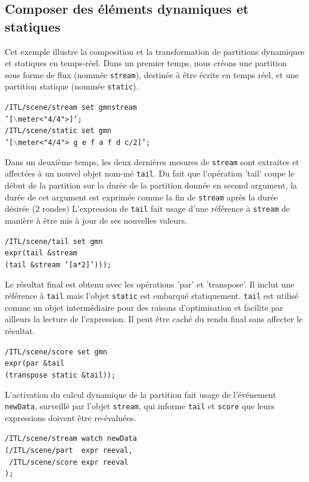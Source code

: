 \documentclass{article}
\newcommand{\OSC}[1]	{{\fontsize{10pt}{10pt} \selectfont\texttt{#1}}}
\newcommand{\tab}{\hspace*{4mm}}
\newcommand{\sample}	[1]			{\vspace{-0.2em}\begin{center}\colorbox{mygrey}{\begin{minipage}[t]{0.97\columnwidth} {\small \texttt{#1}}\end{minipage}}\end{center}}
\begin{document}
\subsection{Composer des éléments dynamiques et statiques}\label{sample3}
Cet exemple illustre la composition et la transformation de partitions dynamiques et statiques en temps-réel.
Dans un premier temps, nous créons une partition sous forme de flux (nommée \OSC{stream}), destinée à être écrite en temps réel, et une partition statique (nommée \OSC{static}).
\sample{/ITL/scene/stream set gmnstream \\
\tab \tab '[$\backslash$meter<"4/4">]';\\
/ITL/scene/static set gmn \\
\tab \tab '[$\backslash$meter<"4/4"> g e f a f d c/2]';
}
Dans un deuxième temps, les deux dernières mesures de \OSC{stream} sont extraites et affectées à un nouvel objet nom-mé\OSC{tail}. Du fait que l'opération 'tail' coupe le début de la partition sur la durée de la partition donnée en second argument, la durée de cet argument est exprimée comme la fin de \OSC{stream} après la durée désirée (2 rondes)
L'expression de \OSC{tail} fait usage d'une référence à \OSC{stream} de manière à être mis à jour de ses nouvelles valeurs. 
\sample{/ITL/scene/tail set gmn \\
\tab \tab expr(tail \&stream \\
\tab \tab \tab \tab (tail \&stream '[a*2]')));
}
Le résultat final est obtenu avec les opérations 'par' et 'transpose'. Il inclut une référence à \OSC{tail} mais l'objet \OSC{static} est embarqué statiquement. \OSC{tail} est utilisé comme un objet intermédiaire pour des raisons d'optimisation et facilite par ailleurs la lecture de l'expression. Il peut être caché du rendu final sans affecter le résultat.
\sample{/ITL/scene/score set gmn \\
\tab \tab expr(par \&tail \\
\tab \tab \tab \tab (transpose static \&tail));
}
L'activation du calcul dynamique de la partition fait usage de l'événement \OSC{newData}, surveillé par l'objet \OSC{stream}, qui informe \OSC{tail} et \OSC{score} que leurs expressions doivent être re-évaluées.
\sample{/ITL/scene/stream watch newData \\
\tab \tab (/ITL/scene/part \ expr reeval, \\
\tab \tab \ /ITL/scene/score expr reeval \\
\tab \tab );
}
\end{document}
